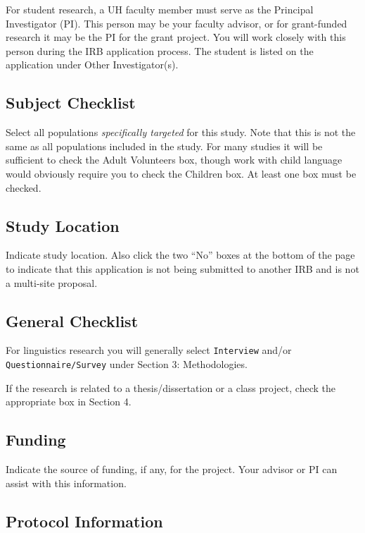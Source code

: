 \documentclass[
]{book}
\begin{document}
For student research, a UH faculty member must serve as the Principal Investigator (PI). This person may be your faculty advisor, or for grant-funded research it may be the PI for the grant project. You will work closely with this person during the IRB application process. The student is listed on the application under Other Investigator(s).

\subsection{Subject Checklist}\label{subject-checklist}

Select all populations \emph{specifically targeted} for this study. Note that this is not the same as all populations included in the study. For many studies it will be sufficient to check the Adult Volunteers box, though work with child language would obviously require you to check the Children box. At least one box must be checked.

\subsection{Study Location}\label{study-location}

Indicate study location. Also click the two ``No'' boxes at the bottom of the page to indicate that this application is not being submitted to another IRB and is not a multi-site proposal.

\subsection{General Checklist}\label{general-checklist}

For linguistics research you will generally select \texttt{Interview} and/or \texttt{Questionnaire/Survey} under Section 3: Methodologies.

If the research is related to a thesis/dissertation or a class project, check the appropriate box in Section 4.

\subsection{Funding}\label{funding-1}

Indicate the source of funding, if any, for the project. Your advisor or PI can assist with this information.

\subsection{Protocol Information}\label{protocol-information}
\end{document}
